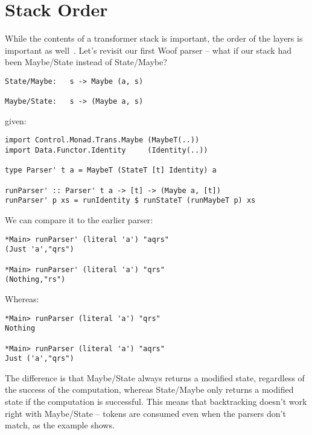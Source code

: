 \documentclass{tmr}
\begin{document}

\section{Stack Order}
While the contents of a transformer stack is important, the order of the
layers is important as well~\cite{stack}.  Let's revisit our first Woof parser -- what if our 
stack had been Maybe/State instead of State/Maybe?
\begin{verbatim}
State/Maybe:   s -> Maybe (a, s)

Maybe/State:   s -> (Maybe a, s)
\end{verbatim}

given:
\begin{verbatim}
import Control.Monad.Trans.Maybe (MaybeT(..))
import Data.Functor.Identity     (Identity(..))

type Parser' t a = MaybeT (StateT [t] Identity) a

runParser' :: Parser' t a -> [t] -> (Maybe a, [t])
runParser' p xs = runIdentity $ runStateT (runMaybeT p) xs
\end{verbatim}

We can compare it to the earlier parser:
\begin{verbatim}
*Main> runParser' (literal 'a') "aqrs"
(Just 'a',"qrs")

*Main> runParser' (literal 'a') "qrs"
(Nothing,"rs")
\end{verbatim}
Whereas:
\begin{verbatim}
*Main> runParser (literal 'a') "qrs"
Nothing

*Main> runParser (literal 'a') "aqrs"
Just ('a',"qrs")
\end{verbatim}

The difference is that Maybe/State always returns a modified state, regardless
of the success of the computation, whereas State/Maybe only returns a modified
state if the computation is successful.  This means that backtracking doesn't
work right with Maybe/State -- tokens are consumed even when the parsers
don't match, as the example shows.
\end{document}
